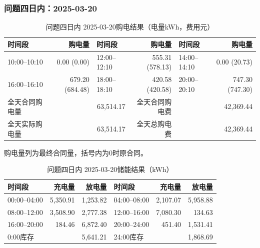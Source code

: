 \par\noindent\begin{minipage}{\textwidth}
\subsubsection*{问题四日内：2025-03-20}
\begin{table}[H]\centering\small\setlength{\tabcolsep}{4pt}\caption{问题四日内 2025-03-20购电结果（电量kWh，费用元）}
\begin{tabular}{lr lr lr}\toprule
时间段 & 购电量 & 时间段 & 购电量 & 时间段 & 购电量\\\midrule
10:00--10:10 & 0.00 (0.00) & 12:00--12:10 & 555.31 (578.13) & 14:00--14:10 & 0.00 (20.73)\\
16:00--16:10 & 679.20 (684.48) & 18:00--18:10 & 420.58 (420.58) & 20:00--20:10 & 747.30 (747.30)\\
\midrule
全天合同购电量 & \multicolumn{2}{r}{63,514.17} & 全天合同购电费 & \multicolumn{2}{r}{42,369.44}\\
全天实际购电量 & \multicolumn{2}{r}{63,514.17} & 全天总购电费 & \multicolumn{2}{r}{42,369.44}\\
\bottomrule\end{tabular}\end{table}
\noindent\small 购电量列为最终合同量，括号内为0时原合同。\normalsize
\begin{table}[H]\centering\small\setlength{\tabcolsep}{4pt}\caption{问题四日内 2025-03-20储能结果（kWh）}
\begin{tabular}{lrr lrr}\toprule
时间段 & 充电量 & 放电量 & 时间段 & 充电量 & 放电量\\\midrule
00:00--04:00 & 5,350.91 & 1,253.82 & 04:00--08:00 & 2,107.07 & 5,958.88\\
08:00--12:00 & 3,508.90 & 2,777.38 & 12:00--16:00 & 7,080.30 & 134.63\\
16:00--20:00 & 184.46 & 6,872.40 & 20:00--24:00 & 451.40 & 1,531.41\\
\midrule
0:00库存 & \multicolumn{2}{r}{5,641.21} & 24:00库存 & \multicolumn{2}{r}{1,868.69}\\
\bottomrule\end{tabular}\end{table}
\end{minipage}\par

